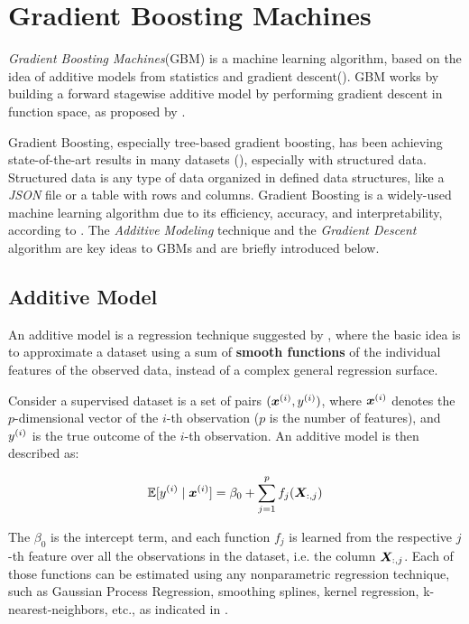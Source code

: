 \chapter{Gradient Boosting Machines}
\label{cap:boosting-intro}

\textit{Gradient Boosting Machines}(GBM) is a machine learning algorithm, based on the idea of additive models from statistics and gradient descent(\cite{hastie2009elements}). GBM works by building a forward stagewise additive model by performing gradient descent in function space, as proposed by \cite{gbmdef}. 

Gradient Boosting, especially tree-based gradient boosting, has been achieving state-of-the-art results in many datasets (\cite{li2012robust}), especially with structured data. Structured data is any type of data organized in defined data structures, like a \textit{JSON} file or a table with rows and columns. Gradient Boosting is a widely-used machine learning algorithm due to its efficiency, accuracy, and interpretability, according to \cite{ke2017lightgbm}. The \textit{Additive Modeling} technique and the \textit{Gradient Descent} algorithm are key ideas to GBMs and are briefly introduced below.

\section{Additive Model}
An additive model is a  regression technique suggested by , where the basic idea is to approximate a dataset using a sum of \textbf{smooth functions} of the individual features of the observed data, instead of a complex general regression surface.

Consider a supervised dataset is a set of pairs $(\bm{x}^{(i)},y^{(i)})$, where $\bm{x}^{(i)}$ denotes the $p$-dimensional vector of the $i$-th observation ($p$ is the number of features), and $y^{(i)}$ is the true outcome of the $i$-th observation. An additive model is then described as:

\begin{equation}\label{eq:additive}
\mathbb{E}[y^{(i)}\mid \bm{x}^{(i)}] = \beta_0 + \sum_{j=1}^pf_j(\bm{X}_{:, j})
\end{equation}

\noindent The $\beta_0$ is the intercept term, and each function $f_j$ is learned from the respective $j$-th feature over all the observations in the dataset, i.e. the column $\bm{X}_{:, j}$. Each of those functions can be estimated using any nonparametric regression technique, such as Gaussian Process Regression, smoothing splines, kernel regression, k-nearest-neighbors, etc., as indicated in \cite{hastie2009elements}.

